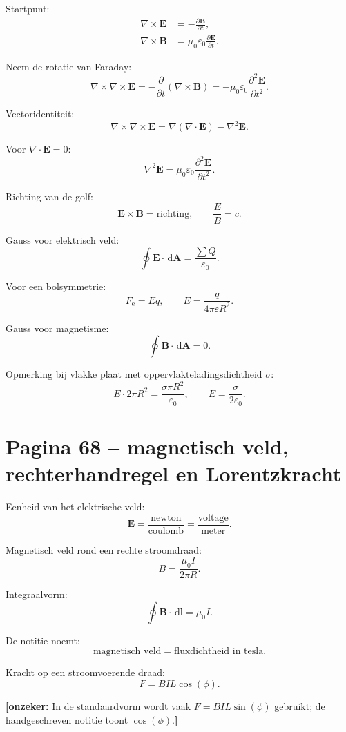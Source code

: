 \documentclass[11pt,a4paper]{article}
\newcommand{\onzeker}[1]{\ifmmode\text{\color{red!70!black}\bfseries[onzeker]}\else\textcolor{red!70!black}{\textbf{[onzeker:} #1\textbf{]}}\fi}
\newcommand{\vect}[1]{\mathbf{#1}}
\newcommand{\dd}{\,\mathrm{d}}
\begin{document}
Startpunt:
\begin{align*}
\nabla\times\vect{E}
&=
-\frac{\partial\vect{B}}{\partial t},\\
\nabla\times\vect{B}
&=
\mu_0\varepsilon_0
\frac{\partial\vect{E}}{\partial t}.
\end{align*}

Neem de rotatie van Faraday:
$$
\nabla\times\nabla\times\vect{E}
=
-\frac{\partial}{\partial t}(\nabla\times\vect{B})
=
-\mu_0\varepsilon_0
\frac{\partial^{2}\vect{E}}{\partial t^{2}}.
$$

Vectoridentiteit:
$$
\nabla\times\nabla\times\vect{E}
=
\nabla(\nabla\cdot\vect{E})-\nabla^{2}\vect{E}.
$$

Voor $\nabla\cdot\vect{E}=0$:
$$
\nabla^{2}\vect{E}
=
\mu_0\varepsilon_0
\frac{\partial^{2}\vect{E}}{\partial t^{2}}.
$$

Richting van de golf:
$$
\vect{E}\times\vect{B}=\text{richting},
\qquad
\frac{E}{B}=c.
$$

Gauss voor elektrisch veld:
$$
\oint \vect{E}\cdot\dd\vect{A}
=
\frac{\sum Q}{\varepsilon_0}.
$$

Voor een bolsymmetrie:
$$
F_{\mathrm{e}}=Eq,
\qquad
E=
\frac{q}{4\pi\varepsilon R^{2}}.
$$

Gauss voor magnetisme:
$$
\oint \vect{B}\cdot\dd\vect{A}=0.
$$

Opmerking bij vlakke plaat met oppervlakteladingsdichtheid $\sigma$:
$$
E\cdot 2\pi R^{2}
=
\frac{\sigma\pi R^{2}}{\varepsilon_0},
\qquad
E=
\frac{\sigma}{2\varepsilon_0}.
$$

\section*{Pagina 68 -- magnetisch veld, rechterhandregel en Lorentzkracht}

Eenheid van het elektrische veld:
$$
\vect{E}
=
\frac{\mathrm{newton}}{\mathrm{coulomb}}
=
\frac{\mathrm{voltage}}{\mathrm{meter}}.
$$

Magnetisch veld rond een rechte stroomdraad:
$$
B=
\frac{\mu_0 I}{2\pi R}.
$$

Integraalvorm:
$$
\oint \vect{B}\cdot\dd\vect{l}
=
\mu_0 I.
$$

De notitie noemt:
$$
\text{magnetisch veld}
=
\text{fluxdichtheid in tesla}.
$$

Kracht op een stroomvoerende draad:
$$
F
=
BIL\cos(\phi).
$$

\onzeker{In de standaardvorm wordt vaak $F=BIL\sin(\phi)$ gebruikt; de handgeschreven notitie toont $\cos(\phi)$.}
\end{document}
